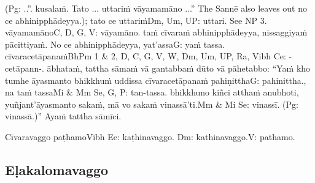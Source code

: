 (Pg: ..”. kusalaṁ. Tato ... uttariṁ vāyamamāno ...” The Sannē also leaves out no ce abhinipphādeyya.); tato ce uttariṁ\makeatletter\hyperlink{endnote-appendix}\makeatother Dm, Um, UP: uttari. See NP 3. vāyamamāno\makeatletter\hyperlink{endnote-appendix}\makeatother C, D, G, V: vāyamāno. taṁ cīvaraṁ abhinipphādeyya, nissaggiyaṁ pācittiyaṁ. No ce abhinipphādeyya, yat'assa\makeatletter\hyperlink{endnote-appendix}\makeatother  G: yaṁ tassa. cīvaracetāpanaṁ\makeatletter\hyperlink{endnote-appendix}\makeatother BhPm 1 & 2, D, C, G, V, W, Dm, Um, UP, Ra, Vibh Ce: -cetāpann-. ābhataṁ, tattha sāmaṁ vā gantabbaṁ dūto vā pāhetabbo: ``Yaṁ kho tumhe āyasmanto bhikkhuṁ uddissa cīvaracetāpanaṁ pahiṇittha\makeatletter\hyperlink{endnote-appendix}\makeatother G: pahinittha., na taṁ tassa\makeatletter\hyperlink{endnote-appendix}\makeatother Mi & Mm Se, G, P: tan-tassa. bhikkhuno kiñci atthaṁ anubhoti, yuñjant'āyasmanto sakaṁ, mā vo sakaṁ vinassā'ti.\makeatletter\hyperlink{endnote-appendix}\makeatother Mm & Mi Se: vinassī. (Pg: vinassā.)'' Ayaṁ tattha sāmīci.

\begin{center}
	Cīvaravaggo paṭhamo\makeatletter\hyperlink{endnote-appendix}\makeatother Vibh Ee: kaṭhinavaggo. Dm: kathinavaggo.\makeatletter\hyperlink{endnote-appendix}\makeatother V: pathamo.
\end{center}



\subsection{Eḷakalomavaggo}

